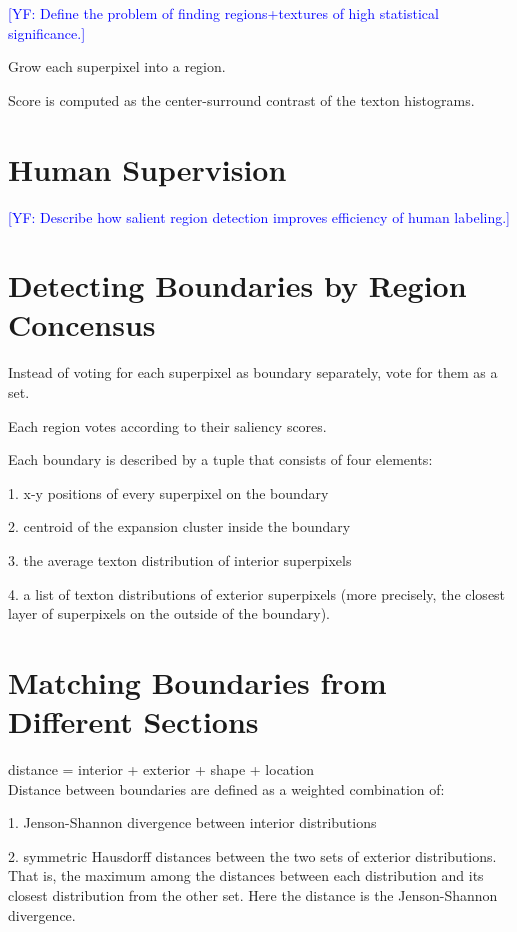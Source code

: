 \documentclass{llncs}
\newcommand{\authcmt}[2]{\textcolor{#1}{#2}}
\newcommand{\yoav}[1]{\authcmt{blue}{[YF: #1]}}
\begin{document}
\yoav{Define the problem of finding regions+textures of high
  statistical significance.}

Grow each superpixel into a region.

Score is computed as the center-surround contrast of the texton histograms.

\section{Human Supervision}

\yoav{Describe how salient region detection improves efficiency of human labeling.}

\section{Detecting Boundaries by Region Concensus}

Instead of voting for each superpixel as boundary separately, vote for them as a set.

Each region votes according to their saliency scores.

Each boundary is described by a tuple that consists of four elements:

1. x-y positions of every superpixel on the boundary

2. centroid of the expansion cluster inside the boundary

3. the average texton distribution of interior superpixels

4. a list of texton distributions of exterior superpixels (more precisely, the closest layer of superpixels on the outside of the boundary).

\section{Matching Boundaries from Different Sections}

distance = interior + exterior + shape + location 
\\

Distance between boundaries are defined as a weighted combination of:

1. Jenson-Shannon divergence between interior distributions

2. symmetric Hausdorff distances between the two sets of exterior distributions. That is, the maximum among the distances between each distribution and its closest distribution from the other set. Here the distance is the Jenson-Shannon divergence.
\end{document}
